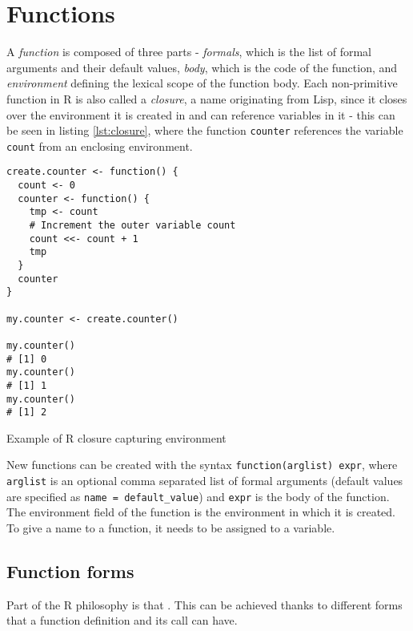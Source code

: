 \section{Functions}

A \textit{function} is composed of three parts - \textit{formals}, which is the list of formal arguments and their default values, \textit{body}, which is the code of the function, and \textit{environment} defining the lexical scope of the function body. Each non-primitive function in R is also called a \textit{closure}, a name originating from Lisp, since it closes over the environment it is created in and can reference variables in it - this can be seen in listing \ref{lst:closure}, where the function \texttt{counter} references the variable \texttt{count} from an enclosing environment.

\begin{listing}[h!]
	\centering
	\begin{verbatim}
create.counter <- function() {
  count <- 0
  counter <- function() {
    tmp <- count
    # Increment the outer variable count
    count <<- count + 1
    tmp
  }
  counter
}

my.counter <- create.counter()

my.counter()
# [1] 0
my.counter()
# [1] 1
my.counter()
# [1] 2
  \end{verbatim}
	\caption{Example of R closure capturing environment}\label{lst:closure}
\end{listing}

New functions can be created with the syntax \texttt{function(arglist) expr}, where \texttt{arglist} is an optional comma separated list of formal arguments (default values are specified as \texttt{name = default\_value}) and \texttt{expr} is the body of the function. The environment field of the function is the environment in which it is created. To give a name to a function, it needs to be assigned to a variable.

\subsection{Function forms}

Part of the R philosophy is that \todocite. This can be achieved thanks to different forms that a function definition and its call can have.


